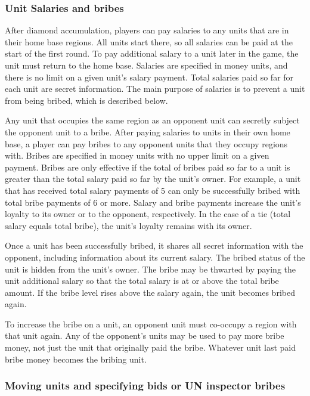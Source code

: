 \documentclass[12pt]{article}
\begin{document}
\subsubsection{Unit Salaries and bribes}

After diamond accumulation, players can pay salaries to any units that are in their home base regions.  All units start there, so all salaries can be paid at the start of the first round.  To pay additional salary to a unit later in the game, the unit must return to the home base.  Salaries are specified in money units, and there is no limit on a given unit's salary payment.  Total salaries paid so far for each unit are secret information.  The main purpose of salaries is to prevent a unit from being bribed, which is described below.

Any unit that occupies the same region as an opponent unit can secretly subject the opponent unit to a bribe.  After paying salaries to units in their own home base, a player can pay bribes to any opponent units that they occupy regions with.  Bribes are specified in money units with no upper limit on a given payment.  Bribes are only effective if the total of bribes paid so far to a unit is greater than the total salary paid so far by the unit's owner.  For example, a unit that has received total salary payments of 5 can only be successfully bribed with total bribe payments of 6 or more.  Salary and bribe payments increase the unit's loyalty to its owner or to the opponent, respectively.  In the case of a tie (total salary equals total bribe), the unit's loyalty remains with its owner. 

Once a unit has been successfully bribed, it shares all secret information with the opponent, including information about its current salary.  The bribed status of the unit is hidden from the unit's owner.  The bribe may be thwarted by paying the unit additional salary so that the total salary is at or above the total bribe amount.  If the bribe level rises above the salary again, the unit becomes bribed again. 

To increase the bribe on a unit, an opponent unit must co-occupy a region with that unit again.  Any of the opponent's units may be used to pay more bribe money, not just the unit that originally paid the bribe.  Whatever unit last paid bribe money becomes the bribing unit.

\subsubsection{Moving units and specifying bids or UN inspector bribes}
\end{document}
